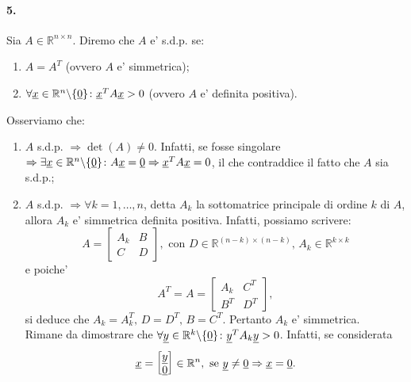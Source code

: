 \paragraph{5.} Sia $A\in\mathbb{R}^{n\times n}$. Diremo che $A$ e' s.d.p. se:
\begin{enumerate}
	\item $A=A^T$ (ovvero $A$ e' simmetrica);
	\item $\forall\uline x\in\mathbb{R}^n\backslash\{\uline 0\}\colon \uline x^T A \uline x > 0$ (ovvero $A$ e' definita positiva).
\end{enumerate}
Osserviamo che:
\begin{enumerate}
	\item $A$ s.d.p. $\Rightarrow\det(A)\neq 0$. Infatti, se fosse singolare $\Rightarrow\exists\uline x\in\mathbb{R}^n\backslash\{\uline 0\}\colon A\uline x = \uline 0 \Rightarrow \uline x^T A \uline x = 0$, il che contraddice il fatto che $A$ sia s.d.p.;
	\item $A$ s.d.p. $\Rightarrow \forall k=1,\hdots, n$, detta $A_k$ la sottomatrice principale di ordine $k$ di $A$, allora $A_k$ e' simmetrica definita positiva. Infatti, possiamo scrivere:
	\begin{equation*}
		A=\left[
		\begin{array}{c|c}
			A_k & B\\
			\hline
			C & D
		\end{array}
		\right], \text{ con } D\in\mathbb R^{(n-k)\times (n-k)},\, A_k\in\mathbb{R}^{k\times k}
	\end{equation*}
	e poiche'
	\begin{equation*}
		A^T=A=\left[
		\begin{array}{c|c}
			A_k & C^T\\
			\hline
			B^T & D^T
		\end{array}
		\right],
	\end{equation*}
	si deduce che $A_k=A_k^T,\, D=D^T,\, B = C^T$. Pertanto $A_k$ e' simmetrica.\\
	Rimane da dimostrare che $\forall\uline y\in\mathbb{R}^k\backslash\{\uline 0\}\colon\uline y^T A_k \uline y > 0$. Infatti, se considerata
	\begin{equation*}
		\uline x = 
		\begin{bmatrix}
			\uline y\\
			\uline 0
		\end{bmatrix}\in\mathbb{R}^n, \text{ se } \uline y\neq\uline 0 \Rightarrow\uline x = \uline 0.
	\end{equation*}

\end{enumerate}
